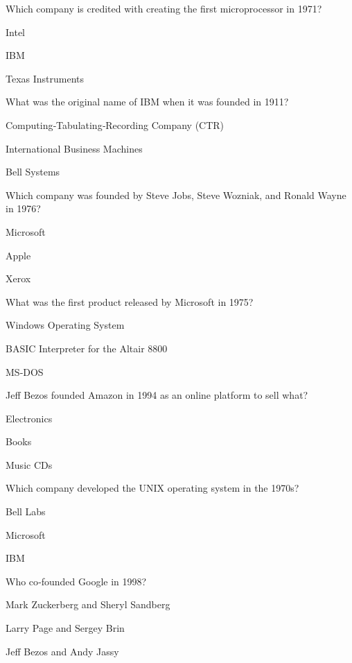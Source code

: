 
\begin{enhancedmcq}{Which company is credited with creating the first microprocessor in 1971?}
\item Intel
\item IBM
\item Texas Instruments

\end{enhancedmcq}
\begin{enhancedmcq}{What was the original name of IBM when it was founded in 1911?}
\item Computing‑Tabulating‑Recording Company (CTR)
\item International Business Machines
\item Bell Systems

\end{enhancedmcq}
\begin{enhancedmcq}{Which company was founded by Steve Jobs, Steve Wozniak, and Ronald Wayne in 1976?}
\item Microsoft
\item Apple
\item Xerox

\end{enhancedmcq}
\begin{enhancedmcq}{What was the first product released by Microsoft in 1975?}
\item Windows Operating System
\item BASIC Interpreter for the Altair 8800
\item MS‑DOS

\end{enhancedmcq}
\begin{enhancedmcq}{Jeff Bezos founded Amazon in 1994 as an online platform to sell what?}
\item Electronics
\item Books
\item Music CDs

\end{enhancedmcq}
\begin{enhancedmcq}{Which company developed the UNIX operating system in the 1970s?}
\item Bell Labs
\item Microsoft
\item IBM

\end{enhancedmcq}
\begin{enhancedmcq}{Who co‑founded Google in 1998?}
\item Mark Zuckerberg and Sheryl Sandberg
\item Larry Page and Sergey Brin
\item Jeff Bezos and Andy Jassy

\end{enhancedmcq}
